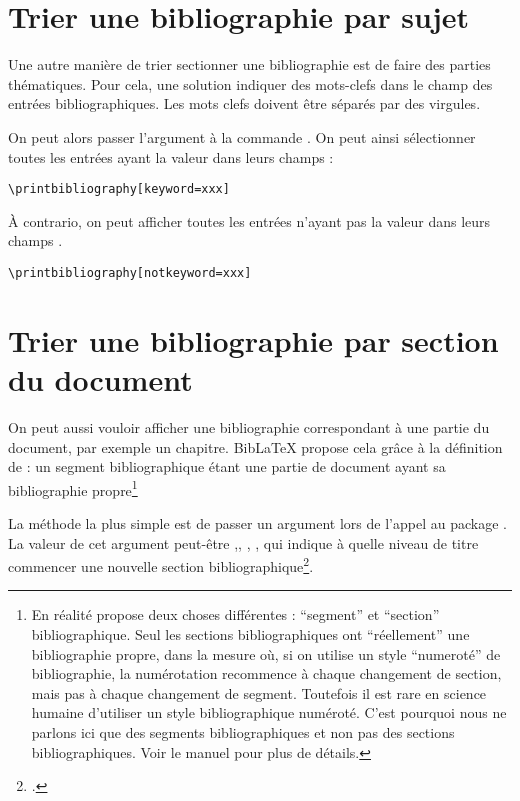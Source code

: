 \section{Trier une bibliographie par sujet}

Une autre manière de trier sectionner une bibliographie est de faire des parties thématiques. Pour cela, une solution indiquer des mots-clefs dans le champ  des entrées bibliographiques. Les mots clefs doivent être séparés par des virgules.

On peut alors passer l'argument  à la commande . On peut ainsi sélectionner toutes les entrées ayant la valeur  dans leurs champs  :

\begin{verbatim}
\printbibliography[keyword=xxx]
\end{verbatim}

À contrario, on peut afficher toutes les entrées n'ayant pas la valeur  dans leurs champs .

\begin{verbatim}
\printbibliography[notkeyword=xxx]
\end{verbatim}


\section{Trier une bibliographie par section du document}

On peut aussi vouloir afficher une bibliographie correspondant à une partie du document, par exemple un chapitre. BibLaTeX propose cela grâce à la définition de  : un segment bibliographique étant une partie de document ayant sa bibliographie propre\footnote{En réalité  propose deux choses différentes : \enquote{segment} et \enquote{section} bibliographique. Seul les sections bibliographiques ont \enquote{réellement} une bibliographie propre, dans la mesure où, si on utilise un style \enquote{numeroté} de bibliographie, la numérotation recommence à chaque changement de section, mais pas à chaque changement de segment. Toutefois il est rare en science humaine d'utiliser un style bibliographique numéroté. C'est pourquoi nous ne parlons ici que des segments bibliographiques et non pas des sections bibliographiques. Voir le manuel pour plus de détails.} 

La méthode la plus simple est de passer un argument  lors de l'appel au package . La valeur de cet argument peut-être ,, , , qui indique à quelle niveau de titre commencer une nouvelle section bibliographique\footcite[Il est toutefois possible de créer des sections bibliographiques autrement que suivant les niveaux de titre : voir]{biblatex_bibsegment}.


